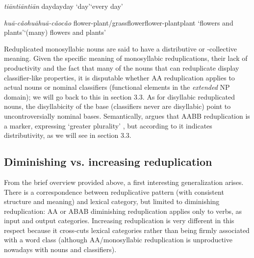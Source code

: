 \documentclass[output=paper]{langsci/langscibook}
\begin{document}
\vspace{\topsep}\ea\label{ex:BascianoMelloni:10}

  \ea\label{ex:BascianoMelloni:10a}%
          {\emph{tiān}}{\emph{tiān}\tld{}\emph{tiān}}%
          {day}{day\tld{}day}%
          {`day'}{`every day'}%

  \ex\label{ex:BascianoMelloni:10b}%
          {\emph{huā-cǎo}}{\emph{huā}\tld{}\emph{huā-cǎo}\tld{}\emph{cǎo}}%
          {flower-plant/grass}{flower\tld{}flower-plant\tld{}plant}%
          {`flowers and plants'}{`(many) flowers and plants'}%
\z\z

Reduplicated monosyllabic nouns are said to have a distributive %
\citep[see e.g.][]{Li1981,Hu95,Li09,Xu2012} %
%
or
-collective %
\citep{Paris2007} %
%
meaning. Given the specific meaning of
monosyllabic reduplications, their lack of productivity and the fact
that many of the nouns that can reduplicate display classifier-like
properties, it is disputable whether AA reduplication applies
to actual nouns or nominal classifiers (functional elements in the
\emph{extended} NP domain); we will go back to this in section 3.3. As
for disyllabic reduplicated nouns, the disyllabicity of the base
(classifiers never are disyllabic) point to uncontroversially nominal
bases. Semantically, %
\citet{Zhang2015} %
%
argues that AABB reduplication is a
 marker, expressing `greater plurality' %
\citep[see][]{Corbett2000}%
%
, but
according to %
\citet{Xu2012} %
%
it indicates distributivity, as we will see in
section 3.3.

\subsection{Diminishing vs. increasing reduplication}

From the brief overview provided above, a first interesting
generalization arises. There is a correspondence between reduplicative
pattern (with consistent structure and meaning) and lexical category,
but limited to diminishing reduplication: AA or ABAB diminishing
reduplication applies only to verbs, as input and output categories.
Increasing reduplication is very different in this respect because it
cross-cuts lexical categories rather than being firmly associated with a
word class (although AA/monosyllabic reduplication is unproductive
nowadays with nouns and classifiers).
\end{document}
